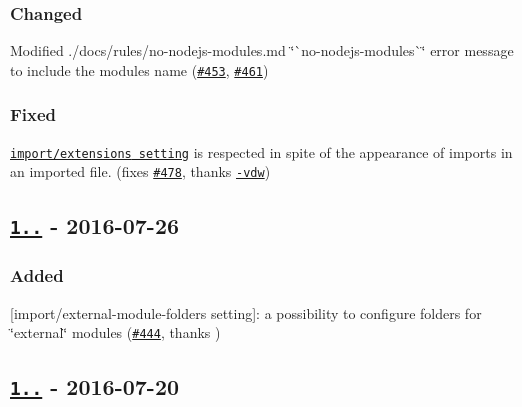 \subsubsection*{Changed}


\begin{DoxyItemize}
\item Modified ./docs/rules/no-\/nodejs-\/modules.md \char`\"{}\`{}no-\/nodejs-\/modules\`{}\char`\"{} error message to include the module\textquotesingle{}s name (\href{https://github.com/benmosher/eslint-plugin-import/issues/453}{\tt \#453}, \href{https://github.com/benmosher/eslint-plugin-import/pull/461}{\tt \#461})
\end{DoxyItemize}

\subsubsection*{Fixed}


\begin{DoxyItemize}
\item \href{./README.md#importextensions}{\tt {\ttfamily import/extensions} setting} is respected in spite of the appearance of imports in an imported file. (fixes \href{https://github.com/benmosher/eslint-plugin-import/issues/478}{\tt \#478}, thanks \href{https://github.com/rhys-vdw}{\tt -\/vdw})
\end{DoxyItemize}

\subsection*{\href{https://github.com/benmosher/eslint-plugin-import/compare/v1.11.1...v1.12.0}{\tt 1..} -\/ 2016-\/07-\/26}

\subsubsection*{Added}


\begin{DoxyItemize}
\item \mbox{[}{\ttfamily import/external-\/module-\/folders} setting\mbox{]}\+: a possibility to configure folders for \char`\"{}external\char`\"{} modules (\href{https://github.com/benmosher/eslint-plugin-import/pull/444}{\tt \#444}, thanks \href{https://github.com/zloirock}{\tt })
\end{DoxyItemize}

\subsection*{\href{https://github.com/benmosher/eslint-plugin-import/compare/v1.11.0...v1.11.1}{\tt 1..} -\/ 2016-\/07-\/20}

